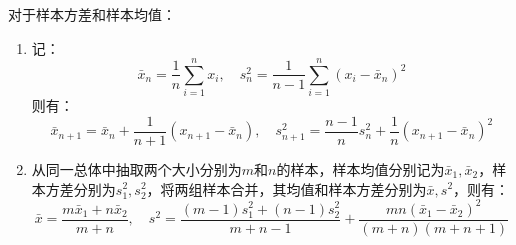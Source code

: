 \begin{theorem}
	对于样本方差和样本均值：
	\begin{enumerate}
		\item 记：
		\begin{equation*}
			\bar{x}_n=\frac{1}{n}\sum_{i=1}^{n}x_i,\quad s_n^2=\frac{1}{n-1}\sum_{i=1}^{n}(x_i-\bar{x}_n)^2
		\end{equation*}
		则有：
		\begin{equation*}
			\bar{x}_{n+1}=\bar{x}_n+\frac{1}{n+1}(x_{n+1}-\bar{x}_n),\quad s_{n+1}^2=\frac{n-1}{n}s_n^2+\frac{1}{n}(x_{n+1}-\bar{x}_n)^2
		\end{equation*}
		\item 从同一总体中抽取两个大小分别为$m$和$n$的样本，样本均值分别记为$\bar{x}_1,\bar{x}_2$，样本方差分别为$s_1^2,s_2^2$，将两组样本合并，其均值和样本方差分别为$\bar{x},s^2$，则有：
		\begin{equation*}
			\bar{x}=\frac{m\bar{x}_1+n\bar{x}_2}{m+n},\quad s^2=\frac{(m-1)s_1^2+(n-1)s_2^2}{m+n-1}+\frac{mn(\bar{x}_1-\bar{x}_2)^2}{(m+n)(m+n+1)}
		\end{equation*}
	\end{enumerate}
\end{theorem}
